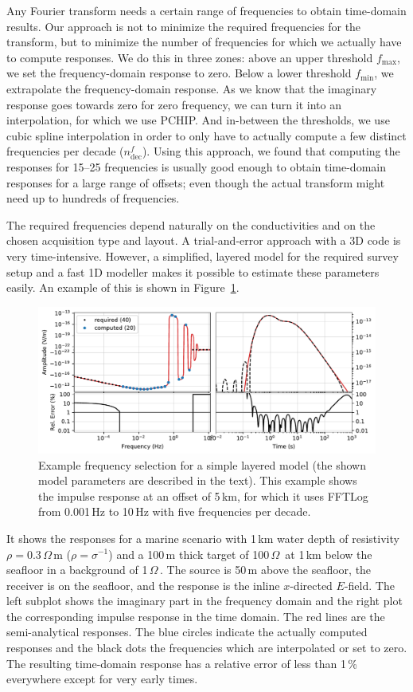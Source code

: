 \documentclass[extra, camera,%
]{gji}
\newlength{\cwidth}
\newcommand{\mr}[1]{\mathrm{#1}}
\newcommand{\ohmm}{\ensuremath{\Omega\,}\text{m}\xspace}
\begin{document}
Any Fourier transform needs a certain range of frequencies to obtain
time-domain results. Our approach is not to minimize the required frequencies
for the transform, but to minimize the number of frequencies for which we
actually have to compute responses. We do this in three zones: above an upper
threshold $f_\mr{max}$, we set the frequency-domain response to zero. Below a
lower threshold $f_\mr{min}$, we extrapolate the frequency-domain response. As
we know that the imaginary response goes towards zero for zero frequency, we
can turn it into an interpolation, for which we use PCHIP. And in-between the
thresholds, we use cubic spline interpolation in order to only have to actually
compute a few distinct frequencies per decade ($n_\mr{dec}^f$). Using this
approach, we found that computing the responses for 15--25 frequencies is
usually good enough to obtain time-domain responses for a large range of
offsets; even though the actual transform might need up to hundreds of
frequencies.

The required frequencies depend naturally on the conductivities and on the
chosen acquisition type and layout. A trial-and-error approach with a 3D code
is very time-intensive. However, a simplified, layered model for the required
survey setup and a fast 1D modeller makes it possible to estimate these
parameters easily. An example of this is shown in Figure~\ref{fig:FFTLog-log}.
%
\begin{figure}
  \centering
  \includegraphics[width=\cwidth]{01-FFTLog-log}
  \caption{Example frequency selection for a simple layered model (the shown
    model parameters are described in the text). This example shows the impulse
    response at an offset of 5\,km, for which it uses FFTLog from 0.001\,Hz to
    10\,Hz with five frequencies per decade.}
  \label{fig:FFTLog-log}
\end{figure}
%
It shows the responses for a marine scenario with 1\,km water depth of
resistivity $\rho=0.3\,\ohmm$ ($\rho = \sigma^{-1}$) and a 100\,m thick target
of 100\,\ohmm at 1\,km below the seafloor in a background of 1\,\ohmm. The
source is 50\,m above the seafloor, the receiver is on the seafloor, and the
response is the inline $x$-directed $E$-field. The left subplot shows the
imaginary part in the frequency domain and the right plot the corresponding
impulse response in the time domain. The red lines are the semi-analytical
responses. The blue circles indicate the actually computed responses and the
black dots the frequencies which are interpolated or set to zero. The resulting
time-domain response has a relative error of less than 1\,\% everywhere except
for very early times.
\end{document}
